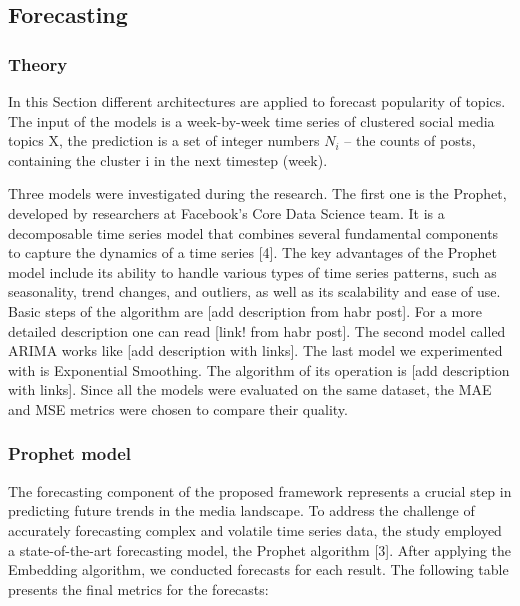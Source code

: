 \subsection{Forecasting}

\subsubsection{Theory}

In this Section different architectures are applied to forecast popularity of topics. The input of the models is a week-by-week time series of clustered social media topics X, the prediction is a set of integer numbers $N_i$ – the counts of posts, containing the cluster i in the next timestep (week).

Three models were investigated during the research. The first one is the Prophet, developed by researchers at Facebook's Core Data Science team. It is a decomposable time series model that combines several fundamental components to capture the dynamics of a time series [4]. The key advantages of the Prophet model include its ability to handle various types of time series patterns, such as seasonality, trend changes, and outliers, as well as its scalability and ease of use. Basic steps of the algorithm are [add description from habr post]. For a more detailed description one can read [link! from habr post].
The second model called ARIMA works like [add description with links]. 
The last model we experimented with is Exponential Smoothing. The algorithm of its operation is [add description with links].
Since all the models were evaluated on the same dataset, the MAE and MSE metrics were chosen to compare their quality.

\subsubsection{Prophet model}

The forecasting component of the proposed framework represents a crucial step in predicting future trends in the media landscape. To address the challenge of accurately forecasting complex and volatile time series data, the study employed a state-of-the-art forecasting model, the Prophet algorithm [3].
After applying the Embedding algorithm, we conducted forecasts for each result. The following table presents the final metrics for the forecasts:

